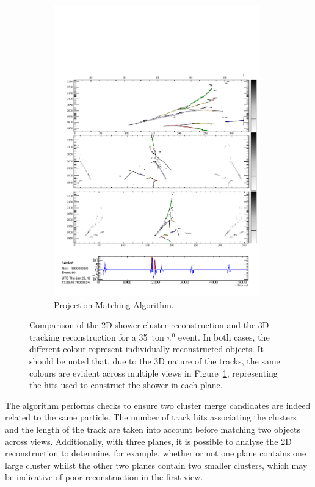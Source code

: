 \begin{figure}
\begin{subfigure}[t]{0.48\linewidth}
    \includegraphics[width=0.98\textwidth]{EVDPi0Tracks2D.pdf}
    \caption{Projection Matching Algorithm.}
    \label{fig:pi0ShowersTracksTracks}
  \end{subfigure}
  \caption[Comparison of the 2D shower cluster reconstruction and the 3D tracking reconstruction for a 35~ton $\pi^0$ event.]{Comparison of the 2D shower cluster reconstruction and the 3D tracking reconstruction for a 35~ton $\pi^0$ event.  In both cases, the different colour represent individually reconstructed objects.  It should be noted that, due to the 3D nature of the tracks, the same colours are evident across multiple views in Figure~\ref{fig:pi0ShowersTracksTracks}, representing the hits used to construct the shower in each plane.}
  \label{fig:pi0ShowersTracks}
\end{figure}

The algorithm performs checks to ensure two cluster merge candidates are indeed related to the same particle.  The number of track hits associating the clusters and the length of the track are taken into account before matching two objects across views.  Additionally, with three planes, it is possible to analyse the 2D reconstruction to determine, for example, whether or not one plane contains one large cluster whilst the other two planes contain two smaller clusters, which may be indicative of poor reconstruction in the first view.

